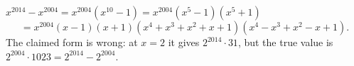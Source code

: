$x^{2014}-x^{2004}=x^{2004}(x^{10}-1)=x^{2004}(x^5-1)(x^5+1)$
\[=\boxed{x^{2004}(x-1)(x+1)(x^4+x^3+x^2+x+1)(x^4-x^3+x^2-x+1)}.\]
The claimed form is wrong: at $x=2$ it gives $2^{2014}\cdot31$, but the true value is $2^{2004}\cdot1023=2^{2014}-2^{2004}$.

